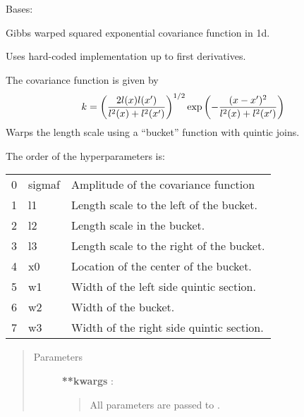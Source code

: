 \documentclass[letterpaper,10pt,english]{sphinxmanual}
\begin{document}

\begin{fulllineitems}
\label{gptools.kernel:gptools.kernel.gibbs.GibbsKernel1dQuinticBucket}
Bases: {\hyperref[gptools.kernel:gptools.kernel.gibbs.GibbsKernel1d]{}}

Gibbs warped squared exponential covariance function in 1d.

Uses hard-coded implementation up to first derivatives.

The covariance function is given by
\begin{gather}
\begin{split}k = \left ( \frac{2l(x)l(x')}{l^2(x)+l^2(x')} \right )^{1/2}\exp\left ( -\frac{(x-x')^2}{l^2(x)+l^2(x')} \right )\end{split}\notag
\end{gather}
Warps the length scale using a ``bucket'' function with quintic joins.

The order of the hyperparameters is:

\begin{tabulary}{\linewidth}{|L|L|L|}
\hline

0
 & 
sigmaf
 & 
Amplitude of the covariance function
\\

1
 & 
l1
 & 
Length scale to the left of the bucket.
\\

2
 & 
l2
 & 
Length scale in the bucket.
\\

3
 & 
l3
 & 
Length scale to the right of the bucket.
\\

4
 & 
x0
 & 
Location of the center of the bucket.
\\

5
 & 
w1
 & 
Width of the left side quintic section.
\\

6
 & 
w2
 & 
Width of the bucket.
\\

7
 & 
w3
 & 
Width of the right side quintic section.
\\
\hline\end{tabulary}

\begin{quote}\begin{description}
\item[{Parameters}] \leavevmode
\textbf{**kwargs} :
\begin{quote}

All parameters are passed to {\hyperref[gptools.kernel:gptools.kernel.core.Kernel]{}}.
\end{quote}

\end{description}\end{quote}

\end{fulllineitems}
\end{document}
